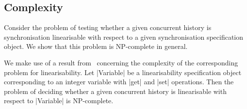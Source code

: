 






\subsection{Complexity}
\label{sec:NP-complete}

Consider the problem of testing whether a given concurrent history is
synchronisation linearisable with respect to a given synchronisation
specification object.  We show that this problem is NP-complete in general.

We make use of a result from~\cite{gibbons-korach} concerning the complexity
of the corresponding problem for linearisability.  Let |Variable| be a
linearisability specification object corresponding to an integer variable with
|get| and |set| operations.  Then the problem of deciding whether a given
concurrent history is linearisable with respect to |Variable| is NP-complete.

